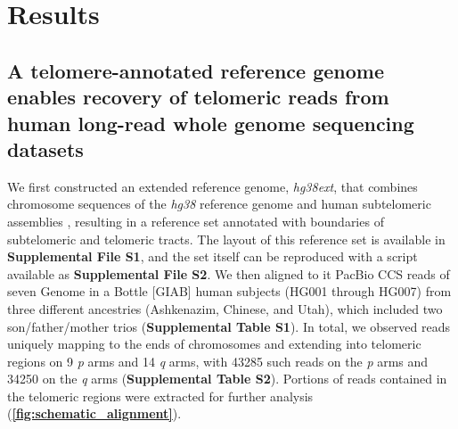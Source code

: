 \documentclass{article}
\begin{document}
\section*{Results} 

\subsection*{A telomere-annotated reference genome enables recovery of telomeric reads from human long-read whole genome sequencing datasets}
    We first constructed an extended reference genome, \textit{hg38ext},
        that combines chromosome sequences of the \textit{hg38} reference genome \parencite{grch38,hg38}
            and human subtelomeric assemblies \parencite{riethman2014},
        resulting in a reference set annotated with boundaries of subtelomeric and telomeric tracts.
        The layout of this reference set is available in \textbf{Supplemental File S1},
            and the set itself can be reproduced with a script available as \textbf{Supplemental File S2}.
    We then aligned to it PacBio CCS reads of seven Genome in a Bottle [GIAB] \parencite{giab} human subjects (HG001 through HG007)
        from three different ancestries (Ashkenazim, Chinese, and Utah),
            which included two son/father/mother trios (\textbf{Supplemental Table S1}).
        In total, we observed reads uniquely mapping to the ends of chromosomes and extending into telomeric regions
            on 9 \textit{p} arms and 14 \textit{q} arms,
                with 43\textendash{}285 such reads on the \textit{p} arms
                and 34\textendash{}250 on the \textit{q} arms
                    (\textbf{Supplemental Table S2}).
    Portions of reads contained in the telomeric regions were extracted for further analysis (\textbf{\autoref{fig:schematic_alignment}}).
\end{document}
